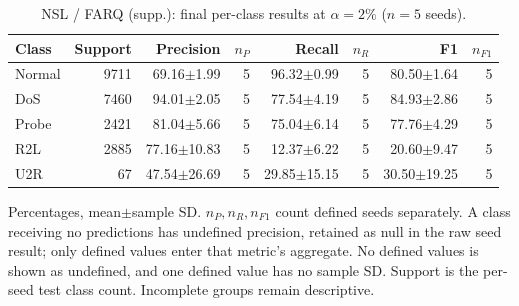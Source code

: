 \begin{table}[t]
\centering\scriptsize
\setlength{\tabcolsep}{3.3pt}
\caption{NSL / FARQ (supp.): final per-class results at $\alpha=2\%$ ($n=5$ seeds).}\label{tab:forgetting-class-nsl_kdd-farq}
\begin{tabular}{lrrrrrrr}
\toprule
Class & Support & Precision & $n_P$ & Recall & $n_R$ & F1 & $n_{F1}$ \\
\midrule
Normal & 9711 & 69.16$\pm$1.99 & 5 & 96.32$\pm$0.99 & 5 & 80.50$\pm$1.64 & 5 \\
DoS & 7460 & 94.01$\pm$2.05 & 5 & 77.54$\pm$4.19 & 5 & 84.93$\pm$2.86 & 5 \\
Probe & 2421 & 81.04$\pm$5.66 & 5 & 75.04$\pm$6.14 & 5 & 77.76$\pm$4.29 & 5 \\
R2L & 2885 & 77.16$\pm$10.83 & 5 & 12.37$\pm$6.22 & 5 & 20.60$\pm$9.47 & 5 \\
U2R & 67 & 47.54$\pm$26.69 & 5 & 29.85$\pm$15.15 & 5 & 30.50$\pm$19.25 & 5 \\
\bottomrule
\end{tabular}
\par\smallskip\begin{minipage}{0.98\textwidth}\scriptsize Percentages, mean$\pm$sample SD. $n_P,n_R,n_{F1}$ count defined seeds separately. A class receiving no predictions has undefined precision, retained as null in the raw seed result; only defined values enter that metric's aggregate. No defined values is shown as undefined, and one defined value has no sample SD. Support is the per-seed test class count. Incomplete groups remain descriptive.\end{minipage}
\end{table}


